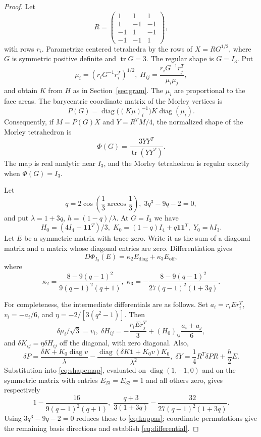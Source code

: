 \documentclass[11pt]{article}
\theoremstyle{definition}
\theoremstyle{remark}
\DeclareMathOperator{\tr}{tr}
\DeclareMathOperator{\diag}{diag}
\newcommand{\one}{\mathbf 1}
\begin{document}
\begin{proof}
Let
\[
R=\begin{pmatrix}1&1&1\\1&-1&-1\\-1&1&-1\\-1&-1&1\end{pmatrix},
\]
with rows $r_i$. Parametrize centered tetrahedra by the rows of $X=RG^{1/2}$, where $G$ is symmetric positive definite and $\tr G=3$. The regular shape is $G=I_3$. Put
\[
\mu_i=(r_iG^{-1}r_i^T)^{1/2},\;
H_{ij}=\frac{r_iG^{-1}r_j^T}{\mu_i\mu_j},
\]
and obtain $K$ from $H$ as in Section~\ref{sec:gram}. The $\mu_i$ are proportional to the face areas. The barycentric coordinate matrix of the Morley vertices is
\[
P(G)=\diag\bigl((K\mu)_i^{-1}\bigr)K\diag(\mu_i).
\]
Consequently, if $M=P(G)X$ and $Y=R^TM/4$, the normalized shape of the Morley tetrahedron is
\begin{equation}
\Phi(G)=\frac{3YY^T}{\tr(YY^T)}.
\label{eq:shapemap}
\end{equation}
The map is real analytic near $I_3$, and the Morley tetrahedron is regular exactly when $\Phi(G)=I_3$.

Let
\[
q=2\cos\left(\frac13\arccos\frac13\right),\;
3q^3-9q-2=0,
\]
and put $\lambda=1+3q$, $h=(1-q)/\lambda$. At $G=I_3$ we have
\[
H_0=(4I_4-\one\one^T)/3,\;
K_0=(1-q)I_4+q\one\one^T,\; Y_0=hI_3.
\]
Let $E$ be a symmetric matrix with trace zero. Write it as the sum of a diagonal matrix and a matrix whose diagonal entries are zero. Differentiation gives
\begin{equation}
D\Phi_{I_3}(E)=\kappa_2 E_{\mathrm{diag}}+\kappa_3 E_{\mathrm{off}},
\label{eq:differential}
\end{equation}
where
\begin{equation}
\kappa_2=\frac{8-9(q-1)^2}{9(q-1)^2(q+1)},
\;
\kappa_3=-\frac{8-9(q-1)^2}{27(q-1)^2(1+3q)}.
\label{eq:kappas}
\end{equation}

For completeness, the intermediate differentials are as follows. Set $a_i=r_iEr_i^T$, $v_i=-a_i/6$, and $\eta=-2/[3(q^2-1)]$. Then
\[
\delta\mu_i/\sqrt3=v_i,\;
\delta H_{ij}=-\frac{r_iEr_j^T}{3}+(H_0)_{ij}\frac{a_i+a_j}{6},
\]
and $\delta K_{ij}=\eta\delta H_{ij}$ off the diagonal, with zero diagonal. Also,
\[
\delta P=\frac{\delta K+K_0\diag v}{\lambda}
-\frac{\diag(\delta K\one+K_0v)K_0}{\lambda^2},
\;
\delta Y=\frac14R^T\delta P R+\frac h2E.
\]
Substitution into \eqref{eq:shapemap}, evaluated on $\diag(1,-1,0)$ and on the symmetric matrix with entries $E_{23}=E_{32}=1$ and all others zero, gives respectively
\[
1-\frac{16}{9(q-1)^2(q+1)},\;
\frac{q+3}{3(1+3q)}-\frac{32}{27(q-1)^2(1+3q)}.
\]
Using $3q^3-9q-2=0$ reduces these to \eqref{eq:kappas}; coordinate permutations give the remaining basis directions and establish \eqref{eq:differential}.


\end{proof}
\end{document}
